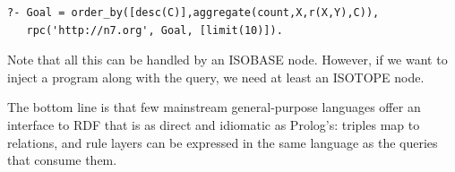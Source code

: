 \begin{verbatim}
?- Goal = order_by([desc(C)],aggregate(count,X,r(X,Y),C)),
   rpc('http://n7.org', Goal, [limit(10)]).
\end{verbatim}

\noindent Note that all this can be handled by an ISOBASE node. However, if we want to inject a program along with the query, we need at least an ISOTOPE node.

The bottom line is that few mainstream general-purpose languages offer an interface to RDF that is as direct and idiomatic as Prolog's: triples map to relations, and rule layers can be expressed in the same language as the queries that consume them.






